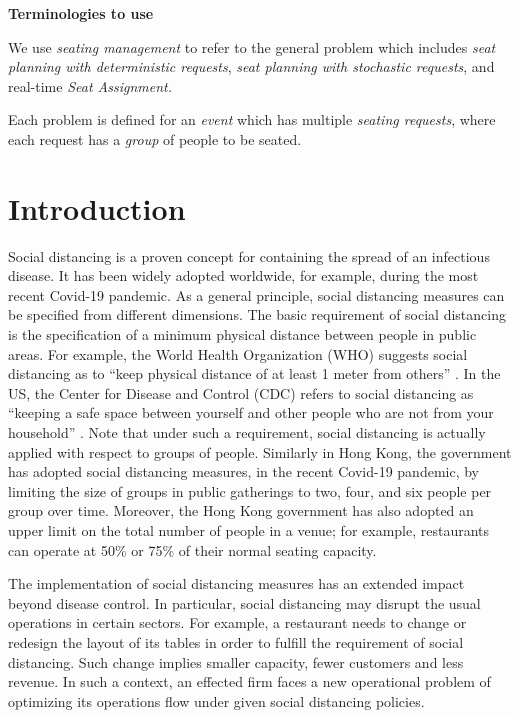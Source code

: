 {\bf Terminologies to use}

We use {\em seating management} to refer to the general problem which includes {\em seat planning with deterministic requests}, 
{\em seat planning with stochastic requests}, and real-time {\em Seat Assignment.}

Each problem is defined for an {\em event} which has multiple {\em seating  requests}, where each request has a {\em group} of people to be seated.


\section{Introduction}
Social distancing is a proven concept for containing the spread of an infectious disease. It has been widely adopted worldwide, for example, during the most recent Covid-19 pandemic. As a general principle, social distancing measures can be specified from different dimensions. The basic requirement of social distancing is the specification of a minimum physical distance between people in public areas. For example, the World Health Organization (WHO) suggests social distancing as to ``keep physical distance of at least 1 meter from others'' \cite{AdviceforPublic}. In the US, the Center for Disease and Control (CDC) refers to social distancing as ``keeping a safe space between yourself and other people who are not from your household'' \cite{CDC}. 
Note that under such a requirement, social distancing is actually applied with respect to groups of people. Similarly in Hong Kong, the government has adopted social distancing measures, in the recent Covid-19 pandemic, by limiting the size of groups in public gatherings to two, four, and six people per group over time. Moreover, the Hong Kong government has also adopted an upper limit on the total number of people in a venue; for example, restaurants can operate at 50\% or 75\% of their normal seating capacity. 


The implementation of social distancing measures has an extended impact beyond disease control. In particular, social distancing may disrupt the usual operations in certain sectors. For example, a restaurant needs to change or redesign the layout of its tables in order to fulfill the requirement of social distancing. Such change implies smaller capacity, fewer customers and less revenue. In such a context, an effected firm faces a new operational problem of optimizing its operations flow under given social distancing policies.

